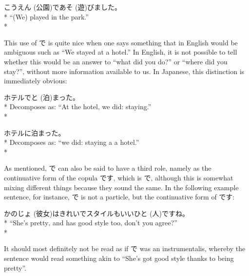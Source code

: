 \documentclass[11pt, b5paper, twoside, openright, onecolumn]{book}
\makeatletter
\newcommand*{\rubystack}[2]{{\relscale{0.5}%
  \begin{tabular}[b]{@{}c@{}}%
    {#1}\\%
   {\textscale{2}{#2}}%
  \end{tabular}}%
}
\DeclareRobustCommand*{\ruby}[2]{%
  \mbox{%
    \setlength{\parskip}{0ex}%
    \BeginAccSupp{method=pdfstringdef,ActualText={#1}}%
      \rubystack{\phantom{#2}}{#1}%
      \llap{%
        \rubystack{#2}{\phantom{#1}}%
      }%
    \EndAccSupp{}%
  }%
}
\renewcommand*{\ruby}[2]{#2 (#1)}%
\newenvironment{exampleblock}{
\setlength{\parindent}{0.6in}
\begin{minipage}[t]{\dimexpr\textwidth-\parindent}}
{\end{minipage}}
\makeatother
\begin{document}
\vspace{0.4cm}
\begin{exampleblock}
\ruby{公園}{こうえん}で\ruby{遊}{あそ}びました。 \\* 
“(We) played in the park.” \\* 
\end{exampleblock}
\vspace{0.2cm}

This use of で is quite nice when one says something that in English would be ambiguous such as “We stayed at a hotel.” In English‚ it is not possible to tell whether this would be an answer to “what did you do?” or “where did you stay?”‚ without more information available to us. In Japanese‚ this distinction is immediately obvious:

\vspace{0.4cm}
\begin{exampleblock}
ホテルで\ruby{泊}{と}まった。 \\* 
Decomposes as: “At the hotel‚ we did: staying.” \\* 
\end{exampleblock}
\vspace{0.2cm}

\begin{exampleblock}
ホテルに泊まった。 \\* 
Decomposes as: “we did: staying a a hotel.” \\* 
\end{exampleblock}
\vspace{0.2cm}

As mentioned‚ で can also be said to have a third role‚ namely as the continuative form of the copula です‚ which is で‚ although this is somewhat mixing different things because they sound the same. In the following example sentence‚ for instance‚ で is not a particle‚ but the continuative form of です:

\vspace{0.4cm}
\begin{exampleblock}
\ruby{彼女}{かのじょ}はきれいでスタイルもいい\ruby{人}{ひと}ですね。 \\* 
“She’s pretty‚ and has good style too‚ don’t you agree?” \\* 
\end{exampleblock}
\vspace{0.2cm}

It should most definitely not be read as if で was an instrumentalis‚ whereby the sentence would read something akin to “She’s got good style thanks to being pretty”.
\end{document}
